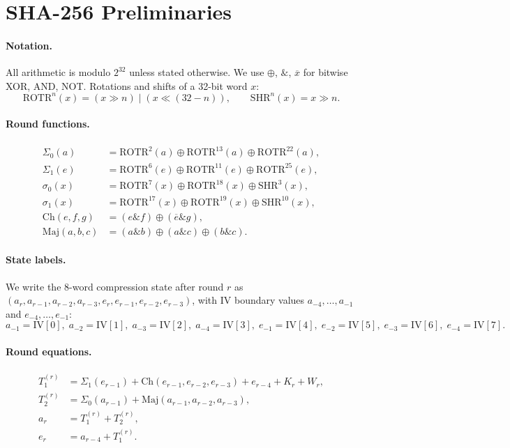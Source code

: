\documentclass[11pt,a4paper]{article}
\newcommand{\Sig}[1]{\Sigma_{#1}}
\newcommand{\sig}[1]{\sigma_{#1}}
\newcommand{\Maj}{\mathrm{Maj}}
\newcommand{\Ch}{\mathrm{Ch}}
\newcommand{\ROTR}[2]{\mathrm{ROTR}^{#1}(#2)}
\newcommand{\SHR}[2]{\mathrm{SHR}^{#1}(#2)}
\begin{document}
\section{SHA-256 Preliminaries}
\label{sec:prelim}

\paragraph{Notation.}
All arithmetic is modulo $2^{32}$ unless stated otherwise.
We use $\oplus$, $\mathbin{\&}$, $\overline{x}$ for bitwise XOR, AND, NOT.
Rotations and shifts of a 32-bit word $x$:
\[
  \ROTR{n}{x} = (x \gg n) \mid (x \ll (32-n)),
  \qquad
  \SHR{n}{x} = x \gg n.
\]

\paragraph{Round functions.}
\begin{align*}
  \Sig{0}(a) &= \ROTR{2}{a} \oplus \ROTR{13}{a} \oplus \ROTR{22}{a}, \\
  \Sig{1}(e) &= \ROTR{6}{e} \oplus \ROTR{11}{e} \oplus \ROTR{25}{e}, \\
  \sig{0}(x) &= \ROTR{7}{x}  \oplus \ROTR{18}{x} \oplus \SHR{3}{x},  \\
  \sig{1}(x) &= \ROTR{17}{x} \oplus \ROTR{19}{x} \oplus \SHR{10}{x}, \\
  \Ch(e,f,g) &= (e \mathbin{\&} f) \oplus (\overline{e} \mathbin{\&} g), \\
  \Maj(a,b,c) &= (a \mathbin{\&} b) \oplus (a \mathbin{\&} c)
                 \oplus (b \mathbin{\&} c).
\end{align*}

\paragraph{State labels.}
We write the 8-word compression state after round $r$ as
$(a_r,a_{r-1},a_{r-2},a_{r-3},\allowbreak e_r,e_{r-1},e_{r-2},e_{r-3})$,
with IV boundary values $a_{-4},\ldots,a_{-1}$
and $e_{-4},\ldots,e_{-1}$:
\[
  a_{-1}{=}\mathrm{IV}[0],\; a_{-2}{=}\mathrm{IV}[1],\;
  a_{-3}{=}\mathrm{IV}[2],\; a_{-4}{=}\mathrm{IV}[3],\;
  e_{-1}{=}\mathrm{IV}[4],\; e_{-2}{=}\mathrm{IV}[5],\;
  e_{-3}{=}\mathrm{IV}[6],\; e_{-4}{=}\mathrm{IV}[7].
\]

\paragraph{Round equations.}
\begin{align}
  T_1^{(r)} &= \Sig{1}(e_{r-1}) + \Ch(e_{r-1},e_{r-2},e_{r-3})
               + e_{r-4} + K_r + W_r, \label{eq:T1}\\
  T_2^{(r)} &= \Sig{0}(a_{r-1}) + \Maj(a_{r-1},a_{r-2},a_{r-3}),
               \label{eq:T2}\\
  a_r       &= T_1^{(r)} + T_2^{(r)}, \label{eq:a} \\
  e_r       &= a_{r-4} + T_1^{(r)}. \label{eq:e}
\end{align}
\end{document}
